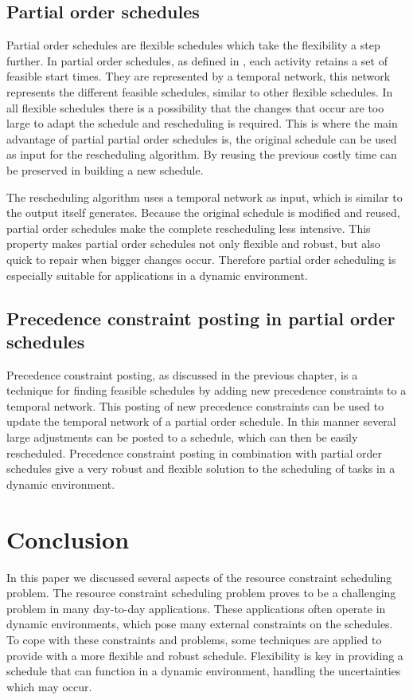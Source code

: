 \documentclass{article}
\begin{document}
\subsection{Partial order schedules}
Partial order schedules are flexible schedules which take the flexibility a step further.
In partial order schedules, as defined in \citet{policella07}, each activity retains a set of feasible start times.
They are represented by a temporal network, this network represents the different feasible schedules, similar to other flexible schedules.
In all flexible schedules there is a possibility that the changes that occur are too large to adapt the schedule and rescheduling is required.
This is where the main advantage of partial partial order schedules is, the original schedule can be used as input for the rescheduling algorithm.
By reusing the previous costly time can be preserved in building a new schedule.

The rescheduling algorithm uses a temporal network as input, which is similar to the output itself generates.
Because the original schedule is modified and reused, partial order schedules make the complete rescheduling less intensive.
This property makes partial order schedules not only flexible and robust, but also quick to repair when bigger changes occur.
Therefore partial order scheduling is especially suitable for applications in a dynamic environment.

\subsection{Precedence constraint posting in partial order schedules}
Precedence constraint posting, as discussed in the previous chapter, is a technique for finding feasible schedules by adding new precedence constraints to a temporal network.
This posting of new precedence constraints can be used to update the temporal network of a partial order schedule.
In this manner several large adjustments can be posted to a schedule, which can then be easily rescheduled.
Precedence constraint posting in combination with partial order schedules give a very robust and flexible solution to the scheduling of tasks in a dynamic environment.

\newpage

\section{Conclusion}
In this paper we discussed several aspects of the resource constraint scheduling problem.
The resource constraint scheduling problem proves to be a challenging problem in many day-to-day applications.
These applications often operate in dynamic environments, which pose many external constraints on the schedules.
To cope with these constraints and problems, some techniques are applied to provide with a more flexible and robust schedule.
Flexibility is key in providing a schedule that can function in a dynamic environment, handling the uncertainties which may occur.
\end{document}
